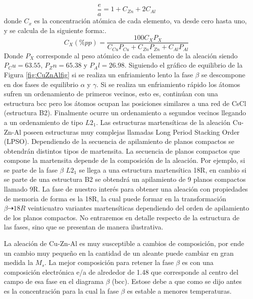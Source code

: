 \documentclass[a4paper,12pt,fleqn,twoside,openany]{book}
\begin{document}
\begin{equation}
\frac{e}{a} = 1+C_{Zn}+2C_{Al} \label{ea}
\end{equation}
donde $C_{x}$ es la concentración atómica de cada elemento, va desde cero hasta uno, y se calcula de la siguiente forma:.
\begin{equation}
C_X (\%pp)=\frac{100 C_X P_X}{C_{Cu} P_{Cu}+C_{Zn} P_{Zn}+C_{Al} P_{Al}}
\end{equation}
Donde $P_X$ corresponde al peso atómico de cada elemento de la aleación siendo $P_Cu=63.55$, $P_Zn=65.38$ y $P_Al=26.98$.
Siguiendo el gráfico de equilibrio de la Figura \ref{fig:CuZnAlfig} si se realiza 
un enfriamiento lento la fase $\beta$ se descompone en dos fases de equilibrio $\alpha$ y $\gamma$. Si se realiza un enfriamiento rápido los átomos sufren un ordenamiento de primeros vecinos, esto es, continúan con una estructura bcc pero los átomos ocupan las posiciones similares a una red de CsCl (estructura B2). Finalmente ocurre un ordenamiento a segundos vecinos llegando a un ordenamiento de tipo $L2_1$. Las estructuras martensíticas de la aleación Cu-Zn-Al 
poseen estructuras muy complejas llamadas Long Period Stacking Order (LPSO). Dependiendo de la secuencia de apilamiento de planos 
compactos se obtendrán distintos tipos de martensita. La secuencia de planos compactos que compone la martensita depende de la composición de la 
aleación. Por ejemplo, si se parte de la fase $\beta$ $L2_1$ se llega a una estructura martensítica 18R, en cambio si se parte de una estructura B2 se 
obtendrá un apilamiento de 9 planos compactos llamado 9R. La fase de nuestro interés para obtener una aleación con propiedades de memoria de forma 
es la 18R, la cual puede formar en la transformación $\beta \dashrightarrow 18R$ veinticuatro variantes martensíticas dependiendo del orden de apilamiento 
de los planos compactos. No entraremos en detalle respecto de la estructura de las fases, sino que se presentan de manera ilustrativa.



La aleación de Cu-Zn-Al es muy susceptible a cambios de composición, por ende un cambio muy pequeño en la cantidad de un aleante puede cambiar en gran medida la $M_s$. 
La mejor composición para retener la fase $\beta$ es con una composición electrónica e/a de alrededor de 1.48 que corresponde al centro del campo de esa fase en el diagrama $\beta$ (bcc). Estose debe a que como se dijo antes es la concentración para la cual la fase $\beta$ es estable a menores temperaturas. 
\end{document}
